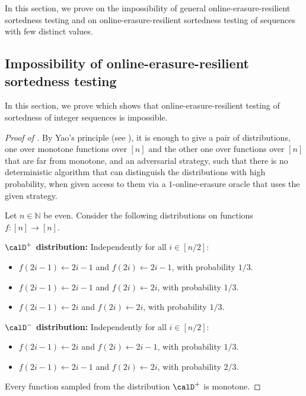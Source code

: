 \documentclass[11pt]{article}
\numberwithin{equation}{section}
\theoremstyle{definition}
\theoremstyle{plain}
\begin{document}
In this section, we prove  on the impossibility of general online-erasure-resilient sortedness testing and  on online-erasure-resilient sortedness testing of sequences with few distinct values. 

%
\subsection{Impossibility of online-erasure-resilient sortedness testing}

In this section, we prove  which shows that online-erasure-resilient testing of sortedness of integer sequences is impossible. 


\begin{proof}[Proof of ]
	By Yao's principle (see ), it is enough to give a pair of distributions, one over monotone functions over $[n]$ and the other one over functions over $[n]$ that are far from monotone, and an adversarial strategy, such that there is no deterministic algorithm that can distinguish the distributions with high probability, when given access to them via a $1$-online-erasure oracle that uses the given strategy. 
	
	\noindent Let $n \in \mathbb{N}$ be even. Consider the following distributions on functions $f:[n] \to [n]$. 
	\medskip
	
	\noindent\textbf{$\calD^+$ distribution:} Independently for all $i \in [n/2]$:  %
	\begin{itemize}
		\item %
		$f(2i-1) \gets 2i-1$ and $f(2i) \gets 2i -1$, with probability $1/3$.
		\item $f(2i-1) \gets 2i-1$ and $f(2i) \gets 2i$, with probability $1/3$.
		\item $f(2i-1) \gets 2i$ and $f(2i) \gets 2i$, with probability $1/3$. %
	\end{itemize}
	
	\noindent\textbf{$\calD^-$ distribution:} Independently for all $i \in [n/2]$: %
	\begin{itemize}
		\item $f(2i-1) \gets 2i$ and $f(2i) \gets 2i -1$, with probability $1/3$. %
		\item $f(2i-1) \gets 2i-1$ and $f(2i) \gets 2i$, with probability $2/3$. %
	\end{itemize}
	
	Every function sampled from the distribution  $\calD^+$ is monotone. 
	

\end{proof}
\end{document}
